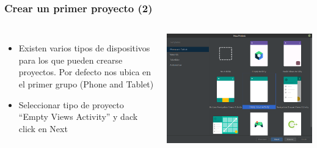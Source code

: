 \begin{frame}
\frametitle{Crear un primer proyecto (2)}  
\begin{columns}
\begin{itemize}
\item Existen varios tipos de dispositivos para los que pueden crearse proyectos. Por defecto nos ubica en el primer grupo (Phone and Tablet)
\item Seleccionar tipo de proyecto  ``Empty Views Activity'' y dack click en Next
\end{itemize}
\begin{center}
\includegraphics[width=0.95\linewidth]{00_PasosParaConfigurarSmartphoneModoDesarrollador/AndroidStudio02.png}    
\end{center}
\end{columns}
\end{frame}

